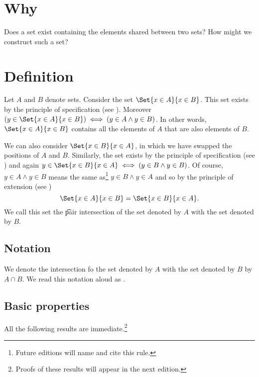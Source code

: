 

\section*{Why}

Does a set exist containing the elements shared between two sets?
How might we construct such a set?

\section*{Definition}

Let $A$ and $B$ denote sets.
Consider the set $\Set{x \in A}{x \in B}$.
This set exists by the principle of specification (see ).
Moreover $(y \in \Set{x \in A}{x \in B}) \iff (y \in A \land y \in B)$.
In other words, $\Set{x \in A}{x \in B}$ contains all the elements of $A$ that are also elements of $B$.

We can also consider $\Set{x \in B}{x \in A}$, in which we have swapped the positions of $A$ and $B$.
Similarly, the set exists by the principle of specification (see ) and again $y \in \Set{x \in B}{x \in A} \iff (y \in B \land y \in B)$.
Of course, $y \in A \land y \in B$ means the same as\footnote{Future editions will name and cite this rule.}
$y \in B \land y \in A$ and so by the principle of extension (see )
    \[
\Set{x \in A}{x \in B} = \Set{x \in B}{x \in A}.
    \]
We call this set the \t{pair intersection} of the set denoted by $A$ with the set denoted by $B$.

\subsection*{Notation}

We denote the intersection fo the set denoted by $A$ with the set denoted by $B$ by $A \cap  B$.
We read this notation aloud as .

\subsection*{Basic properties}

All the following results are immediate.\footnote{Proofs of these results will appear in the next edition.}


